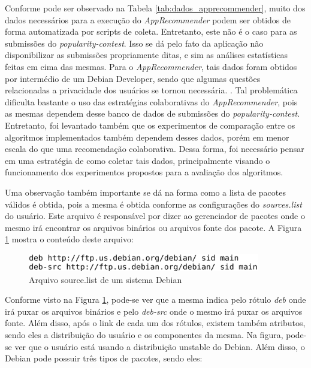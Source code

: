 Conforme pode ser observado na Tabela \ref{tab:dados_apprecommender}, muito dos dados
necessários para a execução do \textit{AppRecommender} podem ser obtidos de forma automatizada
por scripts de coleta. Entretanto, este não é o caso para as submissões do
\textit{popularity-contest}. Isso se dá pelo fato da aplicação não disponibilizar as submissões
propriamente ditas, e sim as análises estatísticas feitas em cima das mesmas. Para o
\textit{AppRecommender}, tais dados foram obtidos por intermédio de um Debian Developer, sendo
que algumas questões relacionadas a privacidade dos usuários se tornou necessária.
\cite{araujo2011apprecommender}. Tal problemática dificulta bastante o uso das
estratégias colaborativas do \textit{AppRecommender}, pois as mesmas dependem desse banco de dados
de submissões do \textit{popularity-contest}. Entretanto, foi levantado também que os
experimentos de comparação entre os algoritmos implementados também dependem
desses dados, porém em menor escala do que uma recomendação colaborativa.
Dessa forma, foi necessário pensar em uma estratégia
de como coletar tais dados, principalmente visando o funcionamento dos experimentos propostos
para a avaliação dos algoritmos.

Uma observação também importante se dá na forma como a lista de pacotes válidos
é obtida, pois a mesma é obtida conforme as configurações do \textit{sources.list} do usuário. Este arquivo é responsável
por dizer ao gerenciador de pacotes onde o mesmo irá encontrar os arquivos binários ou
arquivos fonte dos pacote. A Figura \ref{fig:source_list} mostra o conteúdo deste arquivo:
\\

\begin{figure}[h]
  \centering
  \includegraphics[width=0.9\textwidth]{figuras/source_list.eps}
  \caption{Arquivo source.list de um sistema Debian}
  \label{fig:source_list}
\end{figure}

Conforme visto na Figura \ref{fig:source_list}, pode-se ver que a mesma indica
pelo rótulo \textit{deb} onde irá puxar os arquivos binários e pelo
\textit{deb-src} onde o mesmo irá puxar os arquivos fonte. Além disso, após o
link de cada um dos rótulos, existem também atributos, sendo eles a distribuição
do usuário e os componentes da mesma. Na figura, pode-se ver que o usuário está
usando a distribuição unstable do Debian. Além disso, o Debian pode possuir três
tipos de pacotes, sendo eles:

